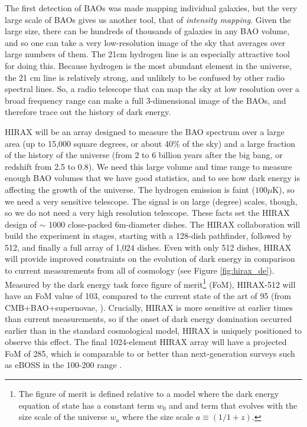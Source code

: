 \documentclass[letterpaper,11pt,preprint]{aastex}
\begin{document}
The first detection of BAOs \citep{Eisenstein05} was made mapping
individual galaxies, but the very large scale of BAOs gives us another
tool, that of {\textit{intensity mapping}}.  Given the large size,
there can be hundreds of thousands of galaxies in any BAO volume, and
so one can take a very low-resolution image of the sky that averages
over large numbers of them.  The 21cm hydrogen line is an especially
attractive tool for doing this.  Because hydrogen is the most abundant
element in the universe, the 21 cm line is relatively strong, and
unlikely to be confused by other radio spectral lines.  So, a radio
telescope that can map the sky at low resolution over a broad
frequency range can make a full 3-dimensional image of the BAOs, and
therefore trace out the history of dark energy.

HIRAX will be an array designed to measure the BAO spectrum over a
large area (up to 15,000 square degrees, or about 40\% of the sky) and
a large fraction of the history of the universe (from 2 to 6 billion
years after the big bang, or redshift from 2.5 to 0.8).  We need this
large volume and time range to measure enough BAO volumes that we have
good statistics, and to see how dark energy is affecting the growth of
the universe.  The hydrogen emission is faint ($100 \mu \mathrm{K}$),
so we need a very sensitive telescope.  The signal is on large
(degree) scales, though, so we do not need a very high resolution
telescope.  These facts set the HIRAX design of $\sim$ 1000
close-packed 6m-diameter dishes.  The HIRAX collaboration will build
the experiment in stages, starting with a 128-dish pathfinder,
followed by 512, and finally a full array of 1,024 dishes.  Even with
only 512 dishes, HIRAX will provide improved constraints on the
evolution of dark energy in comparison to current measurements from
all of cosmology (see Figure \ref{fig:hirax_de}).  Measured by the
dark energy task force figure of merit\footnote{The figure of merit is
  defined relative to a model where the dark energy equation of state
  has a constant term $w_0$ and and term that evolves with the size
  scale of the universe $w_a$ where the size scale $a\equiv(1/1+z)$.}
(FoM), HIRAX-512 will have an FoM value of 103, compared to the
current state of the art of 95 (from CMB+BAO+supernovae,
\citet{Planck2018Params}).  Crucially, HIRAX is more sensitive at
earlier times than current measurements, so if the onset of dark
energy domination occurred earlier than in the standard cosmological
model, HIRAX is uniquely positioned to observe this effect.  The final
1024-element HIRAX array will have a projected FoM of 285, which is
comparable to or better than next-generation surveys such as eBOSS in
the 100-200 range \citep{Zhao2016}.
\end{document}
